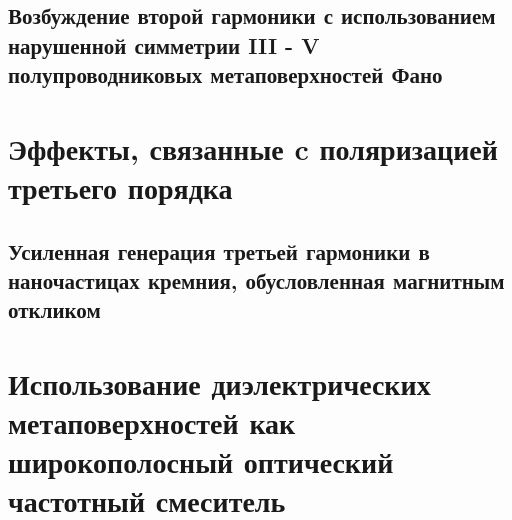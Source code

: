 \subsection{Возбуждение второй гармоники с использованием нарушенной симметрии III - V полупроводниковых метаповерхностей Фано}


\section{Эффекты, связанные c поляризацией третьего порядка}

\subsection{Усиленная генерация третьей гармоники в наночастицах кремния, обусловленная магнитным откликом}

\section{Использование диэлектрических метаповерхностей как широкополосный оптический частотный смеситель}


